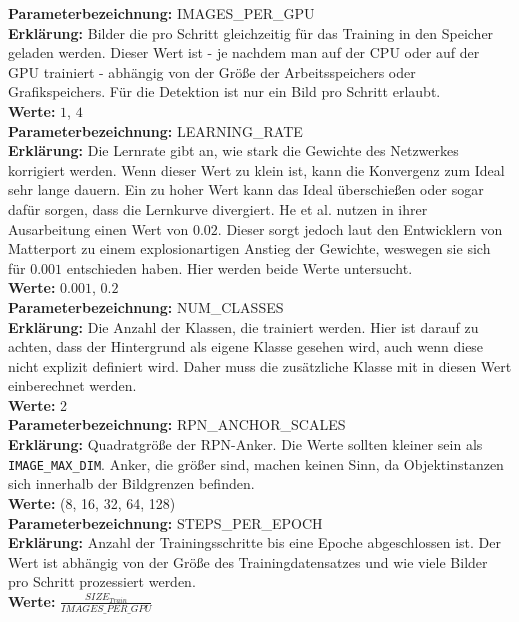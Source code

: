 \noindent
\textbf{Parameterbezeichnung:} IMAGES\_PER\_GPU\\
\textbf{Erklärung:} Bilder die pro Schritt gleichzeitig für das Training in den Speicher geladen werden. Dieser Wert ist - je nachdem man auf der CPU oder auf der GPU trainiert - abhängig von der Größe der Arbeitsspeichers oder Grafikspeichers. Für die Detektion ist nur ein Bild pro Schritt erlaubt.\\
\textbf{Werte:} $1$, $4$\\

\noindent
\textbf{Parameterbezeichnung:} LEARNING\_RATE\\
\textbf{Erklärung:} Die Lernrate gibt an, wie stark die Gewichte des Netzwerkes korrigiert werden. Wenn dieser Wert zu klein ist, kann die Konvergenz zum Ideal sehr lange dauern. Ein zu hoher Wert kann das Ideal überschießen oder sogar dafür sorgen, dass die Lernkurve divergiert. He et al. nutzen in ihrer Ausarbeitung einen Wert von $0.02$.\cite{ref:maskrcnn} Dieser sorgt jedoch laut den Entwicklern von Matterport zu einem explosionartigen Anstieg der Gewichte, weswegen sie sich für $0.001$ entschieden haben.\cite{ref:matterport} Hier werden beide Werte untersucht.\\
\textbf{Werte:} $0.001$, $0.2$\\

\noindent
\textbf{Parameterbezeichnung:} NUM\_CLASSES\\
\textbf{Erklärung:} Die Anzahl der Klassen, die trainiert werden. Hier ist darauf zu achten, dass der Hintergrund als eigene Klasse gesehen wird, auch wenn diese nicht explizit definiert wird. Daher muss die zusätzliche Klasse mit in diesen Wert einberechnet werden.\\
\textbf{Werte:} 2\\

\noindent
\textbf{Parameterbezeichnung:} RPN\_ANCHOR\_SCALES\\
\textbf{Erklärung:} Quadratgröße der RPN-Anker. Die Werte sollten kleiner sein als \texttt{IMAGE\_MAX\_DIM}. Anker, die größer sind, machen keinen Sinn, da Objektinstanzen sich innerhalb der Bildgrenzen befinden.\\
\textbf{Werte:} (8, 16, 32, 64, 128)\\

\noindent
\textbf{Parameterbezeichnung:} STEPS\_PER\_EPOCH\\
\textbf{Erklärung:} Anzahl der Trainingsschritte bis eine Epoche abgeschlossen ist. Der Wert ist abhängig von der Größe des Trainingdatensatzes und wie viele Bilder pro Schritt prozessiert werden.\\
\textbf{Werte:} $\frac{SIZE_{Train}}{IMAGES\_PER\_GPU}$\\

